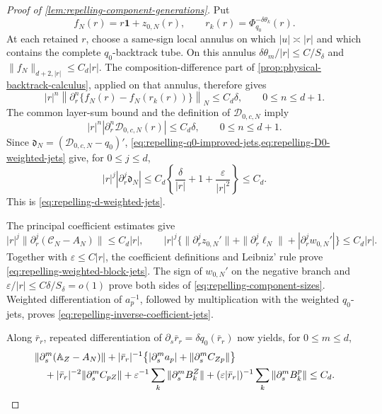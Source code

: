 \begin{proof}[Proof of
\cref{lem:repelling-component-generations}]
Put
\[
 f_N(r)=r\mathbf1+z_{0,N}(r),\qquad
 r_k(r)=\Phi_{q_0}^{-\delta\theta_k}(r).
\]
At each retained \(r\), choose a same-sign local annulus on which
\(|u|\asymp |r|\) and which contains the complete \(q_0\)-backtrack tube.
On this annulus
\(\delta\theta_m/|r|\le C/S_\delta\) and
\(\|f_N\|_{d+2,|r|}\le C_d|r|\).  The composition-difference part of
\cref{prop:physical-backtrack-calculus}, applied on that annulus, therefore
gives
\begin{equation}
 |r|^n\left\|
 \partial_r^n\{f_N(r)-f_N(r_k(r))\}\right\|_N
 \le C_d\delta,\qquad 0\le n\le d+1.              \label{eq:repelling-backtrack-difference-jets}
\end{equation}
The common layer-sum bound and the definition of
\(\mathcal D_{0,c,N}\) imply
\begin{equation}
 |r|^n|\partial_r^n\mathcal D_{0,c,N}(r)|
 \le C_d\delta,\qquad 0\le n\le d+1.              \label{eq:repelling-D0-weighted-jets}
\end{equation}
Since \(\mathfrak d_N=(\mathcal D_{0,c,N}-q_0)'\),
\cref{eq:repelling-q0-improved-jets,eq:repelling-D0-weighted-jets}
give, for \(0\le j\le d\),
\[
 |r|^j|\partial_r^j\mathfrak d_N|
 \le C_d\left\{\frac{\delta}{|r|}
          +1+\frac{\varepsilon}{|r|^2}\right\}\le C_d.
\]
This is \cref{eq:repelling-d-weighted-jets}.

The principal coefficient estimates give
\[
 |r|^j\|\partial_r^j(\mathcal C_N-A_N)\|\le C_d|r|,
 \qquad
 |r|^j\bigl\{\|\partial_r^jz_{0,N}'\|
       +\|\partial_r^j\ell_N\|
       +|\partial_r^jw_{0,N}'|\bigr\}\le C_d|r|.
\]
Together with \(\varepsilon\le C|r|\), the coefficient definitions and
Leibniz' rule prove \cref{eq:repelling-weighted-block-jets}.  The sign of
\(w_{0,N}'\) on the negative branch and
\(\varepsilon/|r|\le C\delta/S_\delta=o(1)\) prove both sides of
\cref{eq:repelling-component-sizes}.  Weighted differentiation of
\(a_p^{-1}\), followed by multiplication with the weighted \(q_0\)-jets,
proves \cref{eq:repelling-inverse-coefficient-jets}.

Along \(\bar r_r\), repeated differentiation of
\(\partial_s\bar r_r=\delta q_0(\bar r_r)\) now yields, for
\(0\le m\le d\),
\begin{align}
 &\|\partial_s^m(\mathbb A_Z-A_N)\|
 +|\bar r_r|^{-1}\bigl\{|\partial_s^ma_p|
                  +\|\partial_s^mC_{Zp}\|\bigr\}\notag\\
 &\quad
 +|\bar r_r|^{-2}\|\partial_s^mC_{pZ}\|
 +\varepsilon^{-1}\sum_k\|\partial_s^mB_k^Z\|
 +(\varepsilon|\bar r_r|)^{-1}
       \sum_k\|\partial_s^mB_k^p\|\le C_d.          \label{eq:repelling-fold-time-block-jets}
\end{align}


\end{proof}
